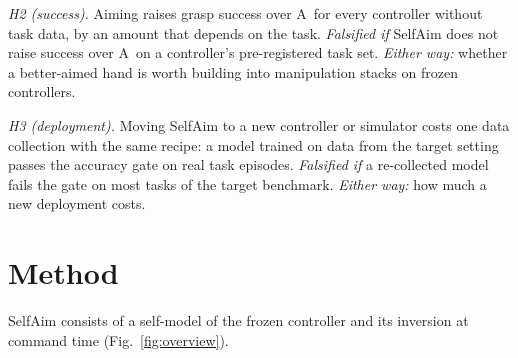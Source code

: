 \documentclass[conference]{IEEEtran}
\newcommand{\Ad}{\textsc{A}}       %
\begin{document}
\emph{H2 (success).} Aiming raises grasp success over \Ad\ for every controller without task data, by an amount that depends on the task. \emph{Falsified if} SelfAim does not raise success over \Ad\ on a controller's pre-registered task set. \emph{Either way:} whether a better-aimed hand is worth building into manipulation stacks on frozen controllers.

\emph{H3 (deployment).} Moving SelfAim to a new controller or simulator costs one data collection with the same recipe: a model trained on data from the target setting passes the accuracy gate on real task episodes. \emph{Falsified if} a re-collected model fails the gate on most tasks of the target benchmark. \emph{Either way:} how much a new deployment costs.

\section{Method}\label{sec:method}
SelfAim consists of a self-model of the frozen controller and its inversion at command time (Fig.~\ref{fig:overview}).
\end{document}

